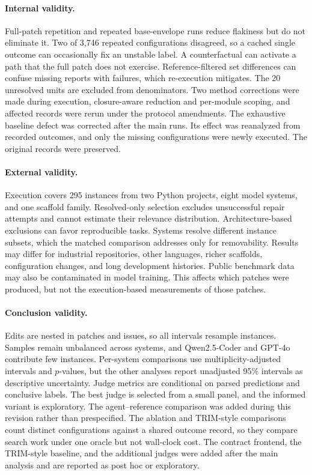 \documentclass[a4paper,fleqn]{cas-sc}
\begin{document}
\paragraph{Internal validity.}
Full-patch repetition and repeated base-envelope runs reduce flakiness but do not eliminate it. Two of 3,746 repeated configurations disagreed, so a cached single outcome can occasionally fix an unstable label. A counterfactual can activate a path that the full patch does not exercise. Reference-filtered set differences can confuse missing reports with failures, which re-execution mitigates. The 20 unresolved units are excluded from denominators. Two method corrections were made during execution, closure-aware reduction and per-module scoping, and affected records were rerun under the protocol amendments. The exhaustive baseline defect was corrected after the main runs. Its effect was reanalyzed from recorded outcomes, and only the missing configurations were newly executed. The original records were preserved.

\paragraph{External validity.}
Execution covers 295 instances from two Python projects, eight model systems, and one scaffold family. Resolved-only selection excludes unsuccessful repair attempts and cannot estimate their relevance distribution. Architecture-based exclusions can favor reproducible tasks. Systems resolve different instance subsets, which the matched comparison addresses only for removability. Results may differ for industrial repositories, other languages, richer scaffolds, configuration changes, and long development histories. Public benchmark data may also be contaminated in model training. This affects which patches were produced, but not the execution-based measurements of those patches.

\paragraph{Conclusion validity.}
Edits are nested in patches and issues, so all intervals resample instances. Samples remain unbalanced across systems, and Qwen2.5-Coder and GPT-4o contribute few instances. Per-system comparisons use multiplicity-adjusted intervals and $p$-values, but the other analyses report unadjusted 95\% intervals as descriptive uncertainty. Judge metrics are conditional on parsed predictions and conclusive labels. The best judge is selected from a small panel, and the informed variant is exploratory. The agent--reference comparison was added during this revision rather than prespecified. The ablation and TRIM-style comparisons count distinct configurations against a shared outcome record, so they compare search work under one oracle but not wall-clock cost. The contract frontend, the TRIM-style baseline, and the additional judges were added after the main analysis and are reported as post hoc or exploratory.
\end{document}
